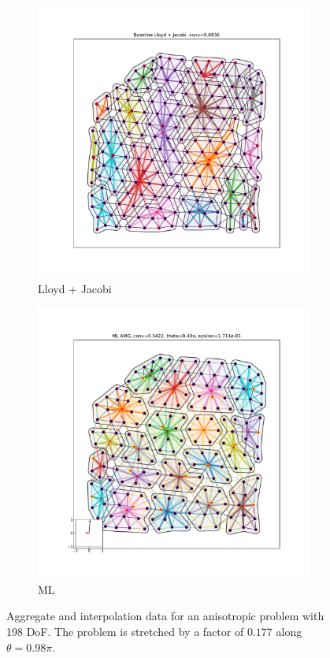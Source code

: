 \documentclass{article}
\begin{document}
\begin{figure}[h]
\begin{subfigure}[t]{0.32\textwidth}
    \includegraphics[width=\textwidth, trim=80 70 70 50, clip]{grid_anis_3_lloyd.pdf}
    \caption{Lloyd + Jacobi}
  \end{subfigure}
  \begin{subfigure}[t]{0.32\textwidth}
    \centering
    \includegraphics[width=\textwidth, trim=80 70 70 50, clip]{grid_anis_3_ml.pdf}
    \caption{ML}
  \end{subfigure}
  \caption{Aggregate and interpolation data for an anisotropic problem with 198 DoF.  The problem is stretched by a factor of $0.177$ along $\theta=0.98\pi$.}
  \label{fig:grid_anis_3}
\end{figure}
\end{document}
